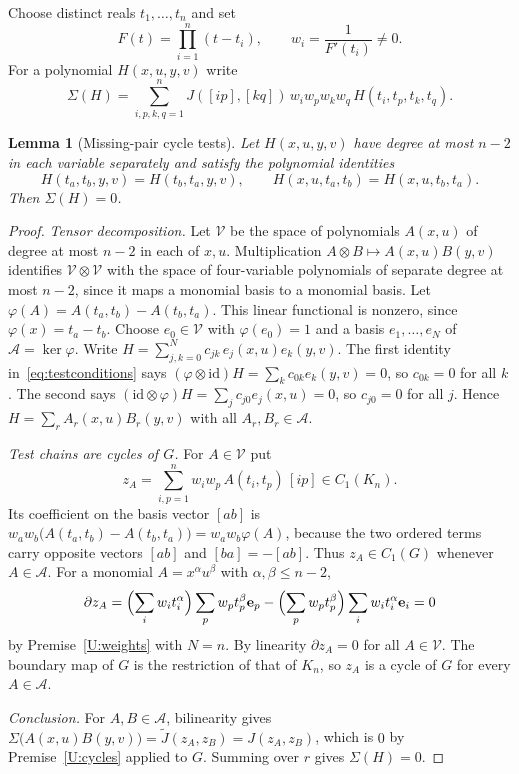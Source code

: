\documentclass[11pt,a4paper]{article}
\newtheorem{lemma}[theorem]{Lemma}
\theoremstyle{definition}
\theoremstyle{remark}
\numberwithin{equation}{section}
\newcommand{\VV}{\mathcal V}
\newcommand{\AAA}{\mathcal A}
\newcommand{\ee}{\mathbf e}
\begin{document}
Choose distinct reals $t_1,\dots,t_n$ and set
\[
F(t)=\prod_{i=1}^n(t-t_i),\qquad w_i=\frac1{F'(t_i)}\neq0.
\]
For a polynomial $H(x,u,y,v)$ write
\begin{equation}\label{eq:testsum}
\Sigma(H)=\sum_{i,p,k,q=1}^{n}J([ip],[kq])\,w_iw_pw_kw_q\,H(t_i,t_p,t_k,t_q).
\end{equation}

\begin{lemma}[Missing-pair cycle tests]\label{lem:tests}
Let $H(x,u,y,v)$ have degree at most $n-2$ in each variable separately and satisfy the polynomial identities
\begin{equation}\label{eq:testconditions}
H(t_a,t_b,y,v)=H(t_b,t_a,y,v),\qquad H(x,u,t_a,t_b)=H(x,u,t_b,t_a).
\end{equation}
Then $\Sigma(H)=0$.
\end{lemma}

\begin{proof}
\emph{Tensor decomposition.} Let $\VV$ be the space of polynomials $A(x,u)$ of degree at most $n-2$ in each of $x,u$. Multiplication $A\otimes B\mapsto A(x,u)B(y,v)$ identifies $\VV\otimes\VV$ with the space of four-variable polynomials of separate degree at most $n-2$, since it maps a monomial basis to a monomial basis. Let $\varphi(A)=A(t_a,t_b)-A(t_b,t_a)$. This linear functional is nonzero, since $\varphi(x)=t_a-t_b$. Choose $e_0\in\VV$ with $\varphi(e_0)=1$ and a basis $e_1,\dots,e_N$ of $\AAA=\ker\varphi$. Write $H=\sum_{j,k=0}^N c_{jk}\,e_j(x,u)e_k(y,v)$. The first identity in~\eqref{eq:testconditions} says $(\varphi\otimes\mathrm{id})H=\sum_k c_{0k}e_k(y,v)=0$, so $c_{0k}=0$ for all $k$. The second says $(\mathrm{id}\otimes\varphi)H=\sum_jc_{j0}e_j(x,u)=0$, so $c_{j0}=0$ for all $j$. Hence $H=\sum_r A_r(x,u)B_r(y,v)$ with all $A_r,B_r\in\AAA$.

\emph{Test chains are cycles of $G$.} For $A\in\VV$ put
\[
z_A=\sum_{i,p=1}^nw_iw_p\,A(t_i,t_p)\,[ip]\in C_1(K_n).
\]
Its coefficient on the basis vector $[ab]$ is $w_aw_b\bigl(A(t_a,t_b)-A(t_b,t_a)\bigr)=w_aw_b\varphi(A)$, because the two ordered terms carry opposite vectors $[ab]$ and $[ba]=-[ab]$. Thus $z_A\in C_1(G)$ whenever $A\in\AAA$. For a monomial $A=x^\alpha u^\beta$ with $\alpha,\beta\le n-2$,
\[
\partial z_A=\Bigl(\sum_iw_it_i^\alpha\Bigr)\sum_pw_pt_p^\beta\ee_p-\Bigl(\sum_pw_pt_p^\beta\Bigr)\sum_iw_it_i^\alpha\ee_i=0
\]
by Premise~\ref{U:weights} with $N=n$. By linearity $\partial z_A=0$ for all $A\in\VV$. The boundary map of $G$ is the restriction of that of $K_n$, so $z_A$ is a cycle of $G$ for every $A\in\AAA$.

\emph{Conclusion.} For $A,B\in\AAA$, bilinearity gives $\Sigma\bigl(A(x,u)B(y,v)\bigr)=\widetilde J(z_A,z_B)=J(z_A,z_B)$, which is $0$ by Premise~\ref{U:cycles} applied to $G$. Summing over $r$ gives $\Sigma(H)=0$.
\end{proof}
\end{document}
